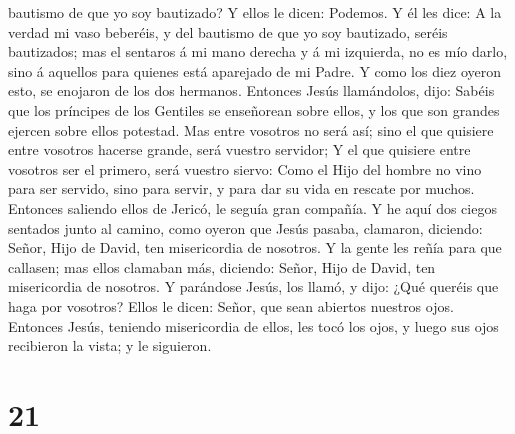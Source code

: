 bautismo de que yo soy bautizado? Y ellos le dicen: Podemos.
 Y él les dice: A la verdad mi vaso beberéis, y del
bautismo de que yo soy bautizado, seréis bautizados; mas el sentaros á
mi mano derecha y á mi izquierda, no es mío darlo, sino á aquellos para
quienes está aparejado de mi Padre.  Y como los diez oyeron
esto, se enojaron de los dos hermanos.  Entonces Jesús
llamándolos, dijo: Sabéis que los príncipes de los Gentiles se
enseñorean sobre ellos, y los que son grandes ejercen sobre ellos
potestad.  Mas entre vosotros no será así; sino el que
quisiere entre vosotros hacerse grande, será vuestro servidor;
 Y el que quisiere entre vosotros ser el primero, será
vuestro siervo:  Como el Hijo del hombre no vino para ser
servido, sino para servir, y para dar su vida en rescate por muchos.
 Entonces saliendo ellos de Jericó, le seguía gran
compañía.  Y he aquí dos ciegos sentados junto al camino,
como oyeron que Jesús pasaba, clamaron, diciendo: Señor, Hijo de David,
ten misericordia de nosotros.  Y la gente les reñía para
que callasen; mas ellos clamaban más, diciendo: Señor, Hijo de David,
ten misericordia de nosotros.  Y parándose Jesús, los
llamó, y dijo: ¿Qué queréis que haga por vosotros?  Ellos
le dicen: Señor, que sean abiertos nuestros ojos.  Entonces
Jesús, teniendo misericordia de ellos, les tocó los ojos, y luego sus
ojos recibieron la vista; y le siguieron.

\hypertarget{section-20}{%
\section{21}\label{section-20}}

